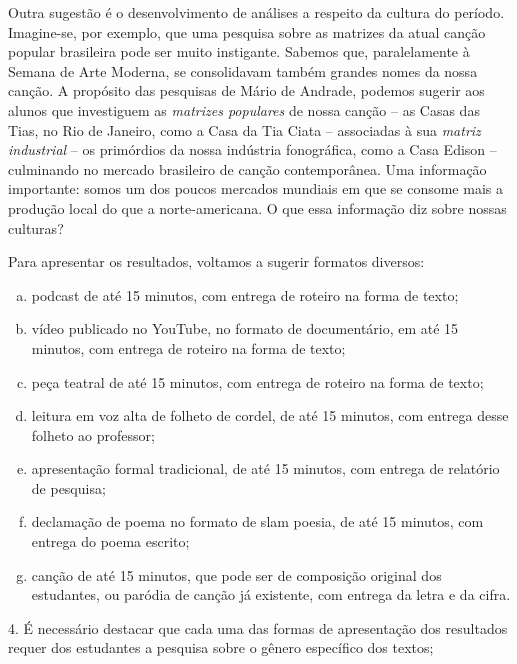 \documentclass[11pt]{extarticle}
\begin{document}
Outra sugestão é o desenvolvimento de análises a respeito da cultura do
período. Imagine-se, por exemplo, que uma pesquisa sobre as matrizes da
atual canção popular brasileira pode ser muito instigante. Sabemos que,
paralelamente à Semana de Arte Moderna, se consolidavam também grandes
nomes da nossa canção. A propósito das pesquisas de Mário de Andrade,
podemos sugerir aos alunos que investiguem as \emph{matrizes populares}
de nossa canção -- as Casas das Tias, no Rio de Janeiro, como a Casa da
Tia Ciata -- associadas à sua \emph{matriz industrial} -- os primórdios
da nossa indústria fonográfica, como a Casa Edison -- culminando no
mercado brasileiro de canção contemporânea. Uma informação importante:
somos um dos poucos mercados mundiais em que se consome mais a produção
local do que a norte-americana. O que essa informação diz sobre nossas
culturas?

Para apresentar os resultados, voltamos a sugerir formatos diversos:

\begin{enumerate}[(a)]  

\item podcast de até 15 minutos, com entrega de roteiro na forma de texto;

\item vídeo publicado no YouTube, no formato de documentário, em até 15
minutos, com entrega de roteiro na forma de texto;

\item peça teatral de até 15 minutos, com entrega de roteiro na forma de
texto;

\item leitura em voz alta de folheto de cordel, de até 15 minutos, com
entrega desse folheto ao professor;

\item apresentação formal tradicional, de até 15 minutos, com entrega de
relatório de pesquisa;

\item declamação de poema no formato de slam poesia, de até 15 minutos, com
entrega do poema escrito;

\item canção de até 15 minutos, que pode ser de composição original dos
estudantes, ou paródia de canção já existente, com entrega da letra e da
cifra.

\end{enumerate} 


4. É necessário destacar que cada uma das formas de apresentação dos
resultados requer dos estudantes a pesquisa sobre o gênero específico
dos textos;
\end{document}
